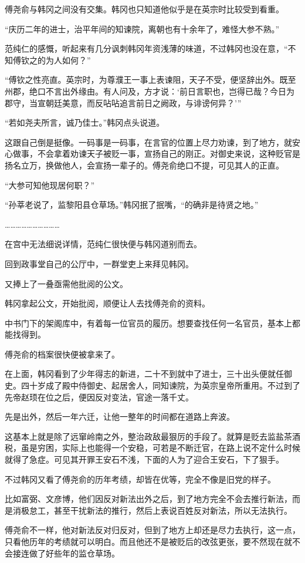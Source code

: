 傅尧俞与韩冈之间没有交集。韩冈也只知道他似乎是在英宗时比较受到看重。

“庆历二年的进士，治平年间的知谏院，离朝也有十余年了，难怪大参不熟。”

范纯仁的感慨，听起来有几分讽刺韩冈年资浅薄的味道，不过韩冈也没在意，“不知傅钦之的为人如何？”

“傅钦之性亮直。英宗时，为尊濮王一事上表谏阻，天子不受，便坚辞出外。既至州郡，绝口不言出外缘由。有人问及，方才说：‘前日言职也，岂得已哉？今日为郡守，当宣朝廷美意，而反呫呫追言前日之阙政，与诽谤何异？’”

“若如尧夫所言，诚乃佳士。”韩冈点头说道。

这跟自己倒是挺像。一码事是一码事，在言官的位置上尽力劝谏，到了地方，就安心做事，不会拿着劝谏天子被贬一事，宣扬自己的刚正。对御史来说，这种贬官是扬名立万，换做他人，会宣扬一辈子的。傅尧俞绝口不提，可见其人的正直。

“大参可知他现居何职？”

“孙莘老说了，监黎阳县仓草场。”韩冈抿了抿嘴，“的确非是待贤之地。”

…………………………

在宫中无法细说详情，范纯仁很快便与韩冈道别而去。

回到政事堂自己的公厅中，一群堂吏上来拜见韩冈。

又捧上了一叠亟需他批阅的公文。

韩冈拿起公文，开始批阅，顺便让人去找傅尧俞的资料。

中书门下的架阁库中，有着每一位官员的履历。想要查找任何一名官员，基本上都能找得到。

傅尧俞的档案很快便被拿来了。

在上面，韩冈看到了少年得志的新进，二十不到就中了进士，三十出头便就任御史。四十岁成了殿中侍御史、起居舍人，同知谏院，为英宗皇帝所重用。不过到了先帝赵顼在位之后，便因反对变法，官途一落千丈。

先是出外，然后一年六迁，让他一整年的时间都在道路上奔波。

这基本上就是除了远窜岭南之外，整治政敌最狠厉的手段了。就算是贬去监盐茶酒税，虽是穷困，实际上也能得一个安稳，可若是不断迁官，在路上说不定什么时候就得了急症。可见其开罪王安石不浅，下面的人为了迎合王安石，下了狠手。

不过韩冈又看了傅尧俞的历年考绩，却皆在优等，完全不像是旧党的样子。

比如富弼、文彦博，他们因反对新法出外之后，到了地方完全不会去推行新法，而是消极怠工，甚至干扰新法的推行，然后上表说百姓反对新法，所以无法执行。

傅尧俞不一样，他对新法反对归反对，但到了地方上却还是尽力去执行，这一点，只看他历年的考绩就可以明白。而且他还不是被贬后的改弦更张，要不然现在就不会接连做了好些年的监仓草场。

